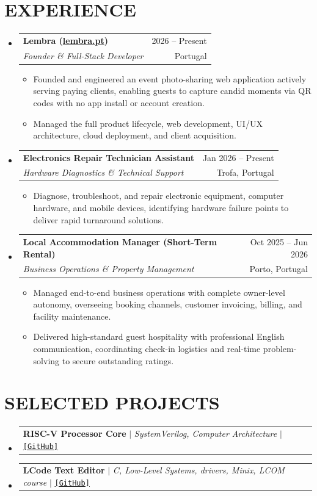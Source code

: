 \documentclass[letterpaper,11pt]{article}
\makeatletter
\newcommand{\resumeItem}[1]{
  \item\small{
    {#1 \vspace{-2pt}}
  }
}
\newcommand{\resumeSubheading}[4]{
  \vspace{-1pt}\item
    \begin{tabular*}{\textwidth}[t]{l@{\extracolsep{\fill}}r}
      \textbf{#1} & {\color{dark-grey}\small #2}\vspace{1pt}\\
      \textit{#3} & {\color{dark-grey} \small #4}\\
    \end{tabular*}\vspace{-6pt}
}
\newcommand{\resumeProjectHeading}[2]{
    \item
    \begin{tabular*}{\textwidth}{l@{\extracolsep{\fill}}r}
      #1 & {\color{dark-grey}} \\
    \end{tabular*}\vspace{-4pt}
}
\newcommand{\resumeSubHeadingListStart}{\begin{itemize}[leftmargin=0in, label={}]}
\newcommand{\resumeSubHeadingListEnd}{\end{itemize}}
\newcommand{\resumeItemListStart}{\begin{itemize}[leftmargin=0.15in]}
\newcommand{\resumeItemListEnd}{\end{itemize}\vspace{-2pt}}
\makeatother
\begin{document}
\section{EXPERIENCE}
  \resumeSubHeadingListStart

    \resumeSubheading
      {Lembra (\href{https://lembra.pt/}{lembra.pt})}{2026 -- Present}
      {Founder \& Full-Stack Developer}{Portugal}
      \resumeItemListStart
        \resumeItem{Founded and engineered an event photo-sharing web application actively serving paying clients, enabling guests to capture candid moments via QR codes with no app install or account creation.}
        \resumeItem{Managed the full product lifecycle, web development, UI/UX architecture, cloud deployment, and client acquisition.}
      \resumeItemListEnd

    \resumeSubheading
      {Electronics Repair Technician Assistant}{Jan 2026 -- Present}
      {Hardware Diagnostics \& Technical Support}{Trofa, Portugal}
      \resumeItemListStart
        \resumeItem{Diagnose, troubleshoot, and repair electronic equipment, computer hardware, and mobile devices, identifying hardware failure points to deliver rapid turnaround solutions.}
      \resumeItemListEnd

    \resumeSubheading
      {Local Accommodation Manager (Short-Term Rental)}{Oct 2025 -- Jun 2026}
      {Business Operations \& Property Management}{Porto, Portugal}
      \resumeItemListStart
        \resumeItem{Managed end-to-end business operations with complete owner-level autonomy, overseeing booking channels, customer invoicing, billing, and facility maintenance.}
        \resumeItem{Delivered high-standard guest hospitality with professional English communication, coordinating check-in logistics and real-time problem-solving to secure outstanding ratings.}
      \resumeItemListEnd

  \resumeSubHeadingListEnd

\section{SELECTED PROJECTS}
  \resumeSubHeadingListStart
    \resumeProjectHeading
      {\textbf{RISC-V Processor Core} $|$ \emph{SystemVerilog, Computer Architecture} $|$ \href{https://github.com/lluissampaio/Risc-V}{\color{cvblue}\texttt{[GitHub]}}}{In Progress}
    \resumeProjectHeading
      {\textbf{LCode Text Editor} $|$ \emph{C, Low-Level Systems, drivers, Minix, LCOM course} $|$ \href{https://github.com/lluissampaio/LCode-Text-Editor}{\color{cvblue}\texttt{[GitHub]}}}{}
  \resumeSubHeadingListEnd
\end{document}
